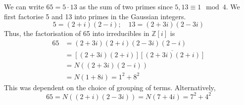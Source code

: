\begin{example}
	We can write \( 65 = 5 \cdot 13 \) as the sum of two primes since \( 5, 13 \equiv 1 \mod 4 \).
	We first factorise 5 and 13 into primes in the Gaussian integers.
	\[
		5 = (2+i)(2-i);\quad 13 = (2+3i)(2-3i)
	\]
	Thus, the factorisation of 65 into irreducibles in \( \mathbb Z[i] \) is
	\begin{align*}
		65 & = (2+3i)(2+i)(2-3i)(2-i)                \\
		   & = [(2+3i)(2+i)]\overline{[(2+3i)(2+i)]} \\
		   & = N((2+3i)(2-i))                        \\
		   & = N(1+8i) = 1^2 + 8^2
	\end{align*}
	This was dependent on the choice of grouping of terms.
	Alternatively,
	\[
		65 = N((2+i)(2-3i)) = N(7+4i) = 7^2 + 4^2
	\]
\end{example}

